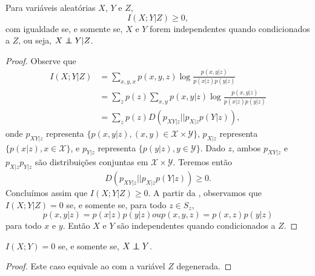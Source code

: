 \begin{theorem}\label{thm:infmutcondnnull}
  Para variáveis aleatórias $X$, $Y$ e $Z$,
  \begin{equation}
    I(X;Y|Z) \geq 0 ,
  \end{equation}
  com igualdade se, e somente se, $X$ e $Y$ forem independentes quando condicionados a $Z$, ou seja,
  $X \independent Y | Z$.
\end{theorem}
\begin{proof}
  Observe que
  \begin{subequations}
    \begin{align}
      I(X;Y|Z) &= \sum_{x,y,x} p(x,y,z) \log \frac{p(x,y|z)}{p(x|z) p(y|z)} \\
               &= \sum_z p(z) \sum_{x,y} p(x,y|z) \log \frac{p(x,y|z)}{p(x|z) p(y|z)} \\
               &= \sum_z p(z) D(p_{XY|z}||p_{X|z} p(Y|z)) ,
    \end{align}
  \end{subequations}
  onde $p_{XY|z}$ representa $\{ p(x,y|z), (x,y) \in \mathcal{X} \times \mathcal{Y} \}$,
  $p_{X|z}$ representa $\{ p(x|z), x \in \mathcal{X} \}$, e
  $p_{Y|z}$ representa $\{ p(y|z), y \in \mathcal{Y} \}$.
  Dado $z$, ambos $p_{XY|z}$ e $p_{X|z}p_{Y|z}$ são distribuições conjuntas em $\mathcal{X} \times \mathcal{Y}$.
  Teremos então
  \begin{equation}
    D(p_{XY|z}||p_{X|z} p(Y|z)) \geq 0 .
  \end{equation}
  Concluímos assim que $I(X;Y|Z) \geq 0$. A partir da , observamos que $I(X;Y|Z) = 0$ se, e somente se,
  para todo $z \in S_z$,
  \begin{subequations}
    \begin{equation}
    p(x,y|z) = p(x|z)p(y|z) 
    \end{equation}
    ou
    \begin{equation}
      p(x,y,z) = p(x,z)p(y|z)
    \end{equation}
  \end{subequations}
  para todo $x$ e $y$. Então $X$ e $Y$ são independentes quando condicionados a $Z$.
\end{proof}


\begin{proposition}\label{prop:indinfmutuanull}
  $I(X;Y) = 0$ se, e somente se, $X \independent Y$.
\end{proposition}
\begin{proof}
  Este caso equivale ao  com a variável $Z$ degenerada.
\end{proof}



